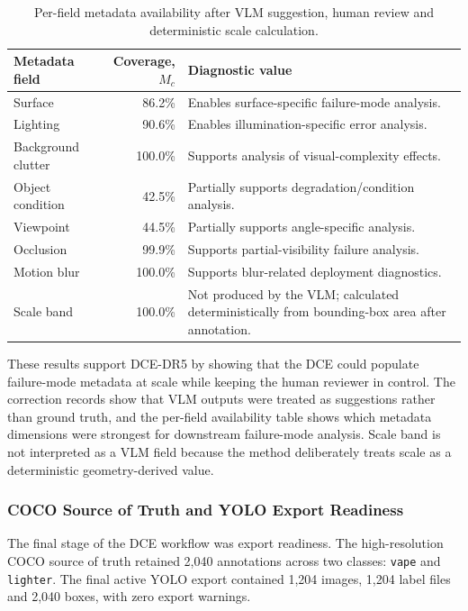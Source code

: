 \begin{table}[H]
\centering
\small
\renewcommand{\arraystretch}{1.2}
\begin{tabularx}{\textwidth}{p{} r X}
\toprule
\textbf{Metadata field} & \textbf{Coverage, $M_c$} & \textbf{Diagnostic value} \\
\midrule
Surface & 86.2\% & Enables surface-specific failure-mode analysis. \\
Lighting & 90.6\% & Enables illumination-specific error analysis. \\
Background clutter & 100.0\% & Supports analysis of visual-complexity effects. \\
Object condition & 42.5\% & Partially supports degradation/condition analysis. \\
Viewpoint & 44.5\% & Partially supports angle-specific analysis. \\
Occlusion & 99.9\% & Supports partial-visibility failure analysis. \\
Motion blur & 100.0\% & Supports blur-related deployment diagnostics. \\
Scale band & 100.0\% & Not produced by the VLM; calculated deterministically from bounding-box area after annotation. \\
\bottomrule
\end{tabularx}
\caption{Per-field metadata availability after VLM suggestion, human review and deterministic scale calculation.}
\label{tab:dce_results_metadata_coverage}
\end{table}

These results support DCE-DR5 by showing that the DCE could populate failure-mode metadata at scale while keeping the human reviewer in control. The correction records show that VLM outputs were treated as suggestions rather than ground truth, and the per-field availability table shows which metadata dimensions were strongest for downstream failure-mode analysis. Scale band is not interpreted as a VLM field because the method deliberately treats scale as a deterministic geometry-derived value.

\subsubsection{COCO Source of Truth and YOLO Export Readiness}

The final stage of the DCE workflow was export readiness. The high-resolution COCO source of truth retained 2,040 annotations across two classes: \texttt{vape} and \texttt{lighter}. The final active YOLO export contained 1,204 images, 1,204 label files and 2,040 boxes, with zero export warnings.

